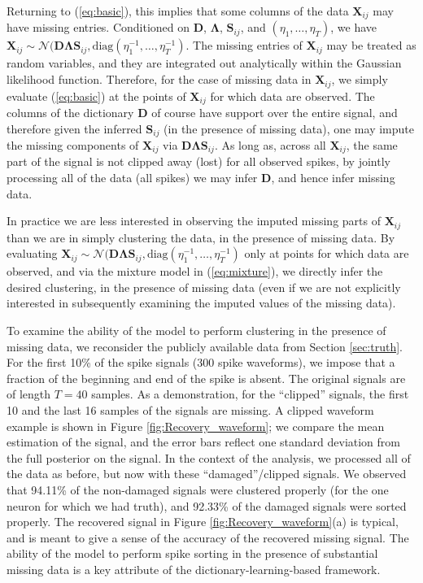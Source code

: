 \documentclass[journal]{IEEEtran}
\def\bf{\mathbf}
\newcommand{\Dmat}{{\bf D}}
\newcommand{\Smat}{{\bf S}}
\newcommand{\Xmat}{{\bf X}}
\newcommand{\Lambdamat}{\boldsymbol{\Lambda}}
\begin{document}
Returning to (\ref{eq:basic}), this implies that some columns of the data $\Xmat_{ij}$ may have missing entries. Conditioned on $\Dmat$, $\Lambdamat$, $\Smat_{ij}$, and $(\eta_1,\dots,\eta_T)$, we have $\Xmat_{ij}\sim\mathcal{N}(\Dmat\Lambdamat\Smat_{ij},\mbox{diag}(\eta_1^{-1},\dots,\eta_T^{-1})$. The missing entries of $\Xmat_{ij}$ may be treated as random variables, and they are integrated out analytically within the Gaussian likelihood function. Therefore, for the case of missing data in $\Xmat_{ij}$, we simply evaluate (\ref{eq:basic}) at the points of $\Xmat_{ij}$ for which data are observed. The columns of the dictionary $\Dmat$ of course have support over the entire signal, and therefore given the inferred $\Smat_{ij}$ (in the presence of missing data), one may impute the missing components of $\Xmat_{ij}$ via $\Dmat\Lambdamat\Smat_{ij}$. As long as, across all $\Xmat_{ij}$, the same part of the signal is not clipped away (lost) for all observed spikes, by jointly processing all of the data (all spikes) we may infer $\Dmat$, and hence infer missing data.

In practice we are less interested in observing the imputed missing parts of $\Xmat_{ij}$ than we are in simply clustering the data, in the presence of missing data. By evaluating $\Xmat_{ij}\sim\mathcal{N}(\Dmat\Lambdamat\Smat_{ij},\mbox{diag}(\eta_1^{-1},\dots,\eta_T^{-1})$ only at points for which data are observed, and via the mixture model in (\ref{eq:mixture}), we directly infer the desired clustering, in the presence of missing data (even if we are not explicitly interested in subsequently examining the imputed values of the missing data).

To examine the ability of the model to perform clustering in the
presence of missing data, we reconsider the publicly available data
from Section \ref{sec:truth}. For the first 10\% of the spike
signals (300 spike waveforms), we impose that a fraction of
the beginning and end of the spike is absent. The original signals
are of length $T=40$ samples. As a demonstration, for the ``clipped'' signals, the first 10 and the last 16 samples of the
signals are missing. A clipped waveform example is shown in Figure \ref{fig:Recovery_waveform}; we compare the mean estimation of the signal, and the error bars reflect one standard deviation from the full posterior on the signal.
In the context of the analysis, we processed all of the data as before, but now with these ``damaged''/clipped signals. We observed that 94.11\% of the non-damaged signals were clustered properly (for the one neuron for which we had truth), and 92.33\% of the damaged signals were sorted properly. The recovered signal in Figure \ref{fig:Recovery_waveform}(a) is typical, and is meant to give a sense of the accuracy of the recovered missing signal. The ability of the model to perform spike sorting in the presence of substantial missing data is a key attribute of the dictionary-learning-based framework.
\end{document}
